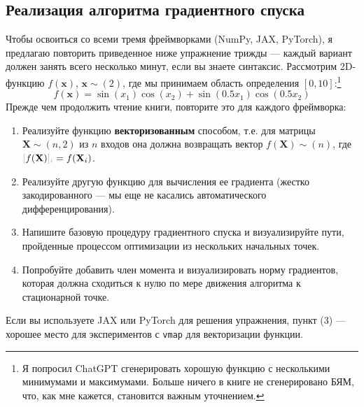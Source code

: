 \subsection*{Реализация алгоритма градиентного спуска}

Чтобы освоиться со всеми тремя фреймворками (NumPy, JAX, PyTorch), я предлагаю повторить приведенное ниже упражнение трижды — каждый вариант должен занять всего несколько минут, если вы знаете синтаксис.  Рассмотрим 2D-функцию $f(\mathbf{x})$, $\mathbf{x} \sim (2)$, где мы принимаем область определения $[0,10]$:\footnote{Я попросил ChatGPT сгенерировать хорошую функцию с несколькими минимумами и максимумами. Больше ничего в книге не сгенерировано БЯМ, что, как мне кажется, становится важным уточнением.}
%
\begin{equation*}
    f(\mathbf{x}) = \sin(x_1) \cos(x_2) + \sin(0.5x_1) \cos(0.5x_2)
\end{equation*}
%
Прежде чем продолжить чтение книги, повторите это для каждого фреймворка:
%
\begin{enumerate}
\item Реализуйте функцию \textbf{векторизованным} способом, т.е. для матрицы $\mathbf{X} \sim (n,2)$ из $n$ входов она должна возвращать вектор $f(\mathbf{X}) \sim (n)$, где $\idx{f(\mathbf{X})}{i} = f(\mathbf{X}_i)$.
\item Реализуйте другую функцию для вычисления ее градиента (жестко закодированного — мы еще не касались автоматического дифференцирования).
\item Напишите базовую процедуру градиентного спуска и визуализируйте пути, пройденные процессом оптимизации из нескольких начальных точек.
\item Попробуйте добавить член момента и визуализировать норму градиентов, которая должна сходиться к нулю по мере движения алгоритма к стационарной точке.
\end{enumerate}
%
Если вы используете JAX или PyTorch для решения упражнения, пункт (3) — хорошее место для экспериментов с \texttt{vmap} для векторизации функции.